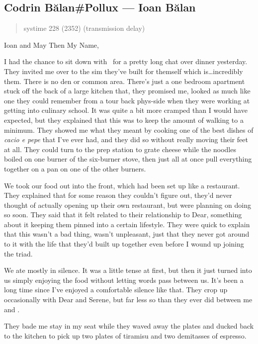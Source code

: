 \hypertarget{codrin-bux103lanpollux-ioan-bux103lan}{%
\subsection{Codrin Bălan\#Pollux — Ioan Bălan}\label{codrin-bux103lanpollux-ioan-bux103lan}}

\begin{quote}
systime 228 (2352) (transmission delay)
\end{quote}

Ioan and May Then My Name,

I had the chance to sit down with \Partner\ for a pretty long chat over dinner yesterday. They invited me over to the sim they've built for themself which is\ldots incredibly them. There is no den or common area. There's just a one bedroom apartment stuck off the back of a large kitchen that, they promised me, looked as much like one they could remember from a tour back phys-side when they were working at getting into culinary school. It was quite a bit more cramped than I would have expected, but they explained that this was to keep the amount of walking to a minimum. They showed me what they meant by cooking one of the best dishes of \emph{cacio e pepe} that I've ever had, and they did so without really moving their feet at all. They could turn to the prep station to grate cheese while the noodles boiled on one burner of the six-burner stove, then just all at once pull everything together on a pan on one of the other burners.

We took our food out into the front, which had been set up like a restaurant. They explained that for some reason they couldn't figure out, they'd never thought of actually opening up their own restaurant, but were planning on doing so soon. They said that it felt related to their relationship to Dear, something about it keeping them pinned into a certain lifestyle. They were quick to explain that this wasn't a bad thing, wasn't unpleasant, just that they never got around to it with the life that they'd built up together even before I wound up joining the triad.

We ate mostly in silence. It was a little tense at first, but then it just turned into us simply enjoying the food without letting words pass between us. It's been a long time since I've enjoyed a comfortable silence like that. They crop up occasionally with Dear and Serene, but far less so than they ever did between me and \Partner .

They bade me stay in my seat while they waved away the plates and ducked back to the kitchen to pick up two plates of tiramisu and two demitasses of espresso.

